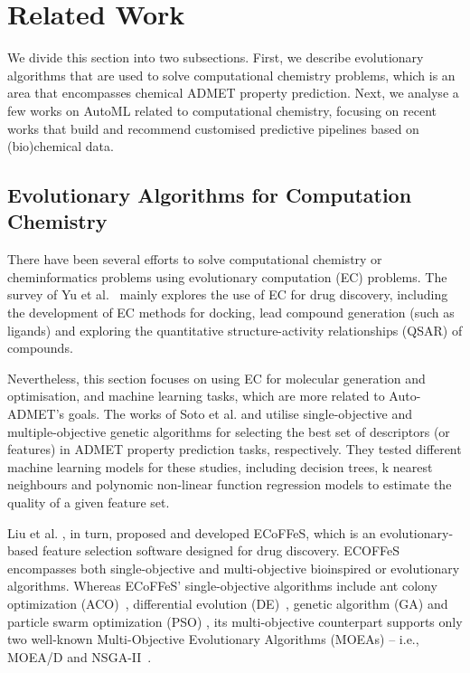 \section{Related Work}
We divide this section into two subsections. First, we describe evolutionary algorithms that are used to solve computational chemistry problems, which is an area that encompasses chemical ADMET property prediction. Next, we analyse a few works on AutoML related to computational chemistry, focusing on recent works that build and recommend customised predictive pipelines based on (bio)chemical data.

\subsection{Evolutionary Algorithms for Computation Chemistry}

There have been several efforts to solve computational chemistry or cheminformatics problems using evolutionary computation (EC) problems. The survey of Yu et al.~\cite{Yu2024} mainly explores the use of EC for drug discovery, including the development of EC methods for docking, lead compound generation (such as ligands) and exploring the quantitative structure-activity relationships (QSAR) of compounds. 

Nevertheless, this section focuses on using EC for molecular generation and optimisation, and machine learning tasks, which are more related to Auto-ADMET's goals. The works of Soto et al. \cite{Soto2008a} and \cite{Soto2008b} utilise single-objective and multiple-objective genetic algorithms for selecting the best set of descriptors (or features) in ADMET property prediction tasks, respectively. They tested different machine learning models for these studies, including decision trees, k nearest neighbours and polynomic non-linear function regression models to estimate the quality of a given feature set. 

Liu et al. \cite{Liu2018}, in turn, proposed and developed ECoFFeS, which is an evolutionary-based feature selection software designed for drug discovery. ECOFFeS encompasses both single-objective and multi-objective bioinspired or evolutionary algorithms. Whereas ECoFFeS' single-objective algorithms include ant colony optimization (ACO)~\cite{Dorigo1996},  differential evolution (DE)~\cite{Storn1997},  genetic algorithm (GA) \cite{Holland1992} and particle swarm optimization (PSO) \cite{Kennedy1995}, its multi-objective counterpart supports only two well-known Multi-Objective Evolutionary Algorithms (MOEAs) -- i.e., MOEA/D \cite{Zhang2007} and NSGA-II~\cite{Deb2002}.

